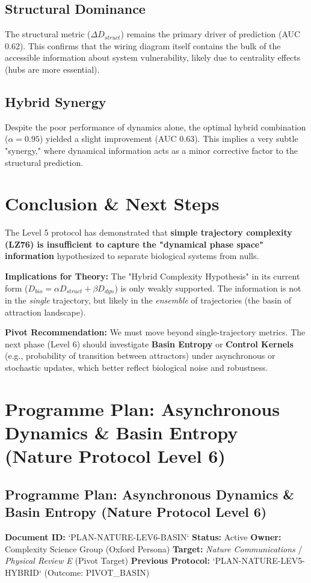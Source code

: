 \documentclass{article}
\begin{document}
\subsection{Structural Dominance}
The structural metric ($\Delta D_{struct}$) remains the primary driver of prediction (AUC 0.62). This confirms that the wiring diagram itself contains the bulk of the accessible information about system vulnerability, likely due to centrality effects (hubs are more essential).

\subsection{Hybrid Synergy}
Despite the poor performance of dynamics alone, the optimal hybrid combination ($\alpha=0.95$) yielded a slight improvement (AUC 0.63). This implies a very subtle "synergy," where dynamical information acts as a minor corrective factor to the structural prediction.

\section{Conclusion \& Next Steps}
The Level 5 protocol has demonstrated that \textbf{simple trajectory complexity (LZ76) is insufficient to capture the "dynamical phase space" information} hypothesized to separate biological systems from nulls.

\textbf{Implications for Theory:}
The "Hybrid Complexity Hypothesis" in its current form ($D_{bio} = \alpha D_{struct} + \beta D_{dyn}$) is only weakly supported. The information is not in the \textit{single} trajectory, but likely in the \textit{ensemble} of trajectories (the basin of attraction landscape).

\textbf{Pivot Recommendation:}
We must move beyond single-trajectory metrics. The next phase (Level 6) should investigate \textbf{Basin Entropy} or \textbf{Control Kernels} (e.g., probability of transition between attractors) under asynchronous or stochastic updates, which better reflect biological noise and robustness.



\section{Programme Plan: Asynchronous Dynamics \& Basin Entropy (Nature Protocol Level 6)}
\subsection{Programme Plan: Asynchronous Dynamics \& Basin Entropy (Nature Protocol Level 6)}
\textbf{Document ID:} `PLAN-NATURE-LEV6-BASIN`
\textbf{Status:} Active
\textbf{Owner:} Complexity Science Group (Oxford Persona)
\textbf{Target:} \textit{Nature Communications} / \textit{Physical Review E} (Pivot Target)
\textbf{Previous Protocol:} `PLAN-NATURE-LEV5-HYBRID` (Outcome: PIVOT\_BASIN)
\end{document}
